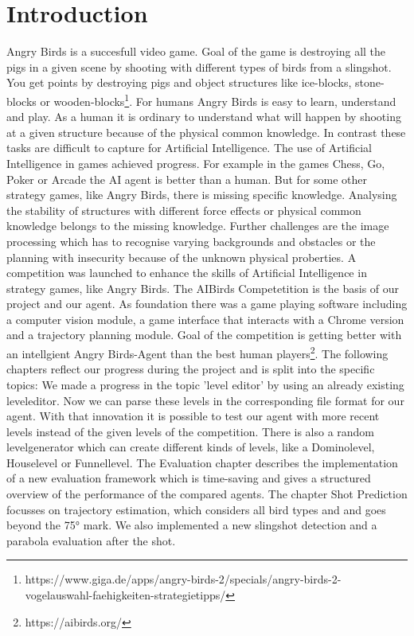 \section{Introduction}\label{ch:intro}

Angry Birds is a succesfull video game. Goal of the game is destroying all the pigs in a given scene by shooting with different types of birds from a slingshot. You get points by destroying pigs and object structures like ice-blocks, stone-blocks or wooden-blocks\footnote{https://www.giga.de/apps/angry-birds-2/specials/angry-birds-2-vogelauswahl-faehigkeiten-strategietipps/}. For humans Angry Birds is easy to learn, understand and play. As a human it is ordinary to understand what will happen by shooting at a given structure because of the physical common knowledge. In contrast these tasks are difficult to capture for Artificial Intelligence. The use of Artificial Intelligence in games achieved progress. For example in the games Chess, Go, Poker or Arcade the AI agent is better than a human. But for some other strategy games, like Angry Birds, there is missing specific knowledge. 
Analysing the stability of structures with different force effects or physical common knowledge belongs to the missing knowledge. Further challenges are the image processing which has to recognise varying backgrounds and obstacles or the planning with insecurity because of the unknown physical proberties. A competition was launched to enhance the skills of Artificial Intelligence in strategy games,  like Angry Birds.
The AIBirds Competetition is the basis of our project and our agent. As foundation there was a game playing software including a computer vision module, a game interface that interacts with a Chrome version and a trajectory planning module. 
Goal of the competition is getting better with an intellgient Angry Birds-Agent than the best human players\footnote{https://aibirds.org/}.
The following chapters reflect our progress during the project and is split into the specific topics: 
We made a progress in the topic 'level editor' by using an already existing leveleditor. Now we can parse these levels in the corresponding file format for our agent. With that innovation it is possible to test our agent with more recent levels instead of the given levels of the competition.  There is also a random levelgenerator which can create different kinds of levels, like a Dominolevel, Houselevel or Funnellevel. The Evaluation chapter describes the implementation of a new evaluation framework which is time-saving and gives a structured overview of the performance of the compared agents. The chapter Shot Prediction focusses on trajectory estimation, which considers all bird types and and goes beyond the \ang{75} mark. We also implemented a new slingshot detection and a parabola evaluation after the shot. 

